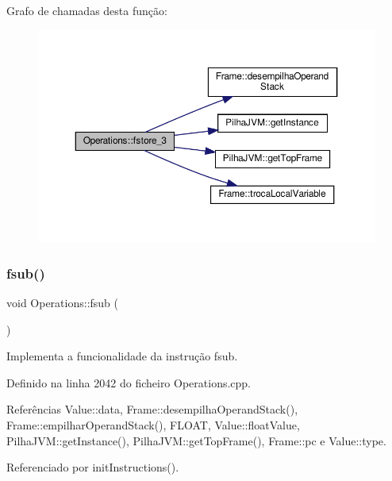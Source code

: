 Grafo de chamadas desta função\+:
\nopagebreak
\begin{figure}[H]
\begin{center}
\leavevmode
\includegraphics[width=350pt]{classOperations_a00786621697e0e6e6c084c3cee1599ae_cgraph}
\end{center}
\end{figure}
\mbox{\label{classOperations_a138cd74b7244e430085eb4850de2b481}} 
\subsubsection{\texorpdfstring{fsub()}{fsub()}}
{\footnotesize\ttfamily void Operations\+::fsub (\begin{DoxyParamCaption}{ }\end{DoxyParamCaption})\hspace{0.3cm}{\ttfamily [private]}}



Implementa a funcionalidade da instrução fsub. 



Definido na linha 2042 do ficheiro Operations.\+cpp.



Referências Value\+::data, Frame\+::desempilha\+Operand\+Stack(), Frame\+::empilhar\+Operand\+Stack(), F\+L\+O\+AT, Value\+::float\+Value, Pilha\+J\+V\+M\+::get\+Instance(), Pilha\+J\+V\+M\+::get\+Top\+Frame(), Frame\+::pc e Value\+::type.



Referenciado por init\+Instructions().

